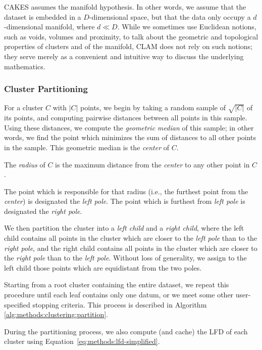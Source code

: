 CAKES assumes the manifold hypothesis. 
In other words, we assume that the dataset is embedded in a $D$-dimensional space, but that the data only occupy a $d$-dimensional manifold, where $d \ll D$. 
While we sometimes use Euclidean notions, such as voids, volumes and proximity, to talk about the geometric and topological properties of clusters and of the manifold, CLAM does not rely on such notions; 
they serve merely as a convenient and intuitive way to discuss the underlying mathematics.


\subsubsection {Cluster Partitioning}
\label{subsubsec:methods:cluster-partitioning}

For a cluster $C$ with $|C|$ points, we begin by taking a random sample of $\sqrt{|C|}$ of its points, and computing pairwise distances between all points in this sample.
Using these distances, we compute the \emph{geometric median} of this sample; in other words, we find the point which minimizes the sum of distances to all other points in the sample.
This geometric median is the \emph{center} of $C$.

The \emph{radius} of $C$ is the maximum distance from the \emph{center} to any other point in $C$.

The point which is responsible for that radius (i.e., the furthest point from the \emph{center}) is designated the \emph{left pole}.
The point which is furthest from \emph{left pole} is designated the \emph{right pole}.

We then partition the cluster into a \emph{left child} and a \emph{right child}, where the left child contains all points in the cluster which are closer to the \emph{left pole} than to the \emph{right pole}, and the right child contains all points in the cluster which are closer to the \emph{right pole} than to the \emph{left pole}.
Without loss of generality, we assign to the left child those points which are equidistant from the two poles.

Starting from a root cluster containing the entire dataset, we repeat this procedure until each leaf contains only one datum, or we meet some other user-specified stopping criteria.
This process is described in Algorithm \ref{alg:methods:clustering:partition}.

During the partitioning process, we also compute (and cache) the LFD of each cluster using Equation~\ref{eq:methods:lfd-simplified}.

